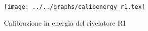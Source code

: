 \begin{figure}[h] \centering\texttt{[image: ../../graphs/calibenergy\_r1.tex]}\caption{Calibrazione in energia del rivelatore R1}\label{gr:calibenergy_r1} \end{figure}
